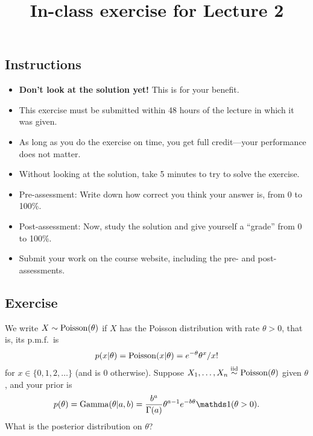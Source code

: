 \documentclass[12pt]{article}
\title{In-class exercise for Lecture 2}
\author{}
\date{}
\begin{document}
\maketitle

\subsection*{Instructions}
\begin{itemize}
\item \textbf{Don't look at the solution yet!} This is for your benefit.
\item This exercise must be submitted within 48 hours of the lecture in which it was given. 
\item As long as you do the exercise on time, you get full credit---your performance does not matter.
\item Without looking at the solution, take 5 minutes to try to solve the exercise.
\item Pre-assessment: Write down how correct you think your answer is, from 0 to 100\%.
\item Post-assessment: Now, study the solution and give yourself a ``grade'' from 0 to 100\%.
\item Submit your work on the course website, including the pre- and post- assessments.
\end{itemize}

\subsection*{Exercise}
We write $X\sim\operatorname*{Poisson}(\theta)$ if $X$ has the Poisson distribution with rate $\theta>0$, that is, its p.m.f.\ is
$$ p(x|\theta) = \operatorname*{Poisson}(x|\theta)= e^{-\theta} \theta^x / x!$$
for $x\in\{0,1,2,\dotsc\}$ (and is $0$ otherwise). Suppose $X_1,\dotsc,X_n\stackrel{\mathrm{iid}}{\sim}\operatorname*{Poisson}(\theta)$ given $\theta$, and your prior is
$$ p(\theta) =\Ga(\theta|a,b) =\frac{b^a}{\Gamma(a)} \theta^{a-1} e^{-b\theta}\I(\theta>0) .$$
What is the posterior distribution on $\theta$?
\end{document}
